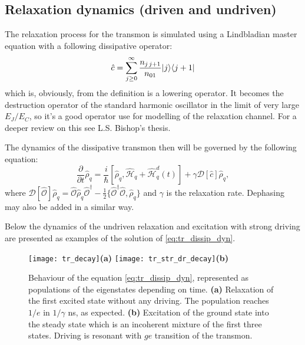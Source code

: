 \documentclass[12pt, twoside]{report}
\DeclarePairedDelimiter\bra{\langle}{\rvert}
\DeclarePairedDelimiter\ket{\lvert}{\rangle}
\numberwithin{equation}{section}
\begin{document}
\subsection{Relaxation dynamics (driven and undriven)}

The relaxation process for the transmon is simulated using a Lindbladian master equation with a following dissipative operator:
\begin{equation}
\hat c = \sum_{j\geq 0}^\infty \frac{n_{j\,j+1} }{n_{01}}\ket{j}\bra{j+1}
\end{equation}
which is, obviously, from the definition is a lowering operator. It becomes the destruction operator of the standard harmonic oscillator in the limit of very large $E_J/E_C$, so it's a good operator use for  modelling of the relaxation channel. For a deeper review on this see L.S. Bishop's thesis.\cite{Bishop2010}

The dynamics of the dissipative transmon then will be governed by the following equation:
\begin{equation}
\frac{\partial}{\partial t} \hat{\rho}_q = \frac{i}{\hbar}[\hat{\rho}_q, \hat{\mathcal{H}}_q+\hat{\mathcal{H}}_q^d(t)] + \gamma \mathcal{D}[\hat c]\hat\rho_q,
\label{eq:tr_dissip_dyn}
\end{equation}
where $ \mathcal{D}[\hat{\mathcal{O}}]\hat\rho_q = \hat{\mathcal{O}} \hat\rho_q \hat{\mathcal{O}}^\dag - \frac{1}{2}\{\hat{\mathcal{O}}^\dag \hat{\mathcal{O}}, \hat\rho_q \}$ and $\gamma$ is the relaxation rate. Dephasing may also be added in a similar way.

Below the dynamics of the undriven relaxation and excitation with strong driving are presented as examples of the solution of \eqref{eq:tr_dissip_dyn}.

\begin{figure}[h]
\texttt{[image: tr\_decay]}\hspace{-7.5cm}\textbf{(a)}\hspace{6.5cm}
\texttt{[image: tr\_str\_dr\_decay]}\hspace{-7.5cm}\textbf{(b)}\hspace{6.5cm}
\caption{Behaviour of the equation \eqref{eq:tr_dissip_dyn}, represented as populations of the eigenstates depending on time. \textbf{(a)} Relaxation of the first excited state without any driving. The population reaches $1/e$ in $1/\gamma$ ns, as expected. \textbf{(b)} Excitation of the ground state into the steady state which is an incoherent mixture of the first three states. Driving is resonant with $ge$ transition of the transmon.}
\end{figure}
\end{document}

